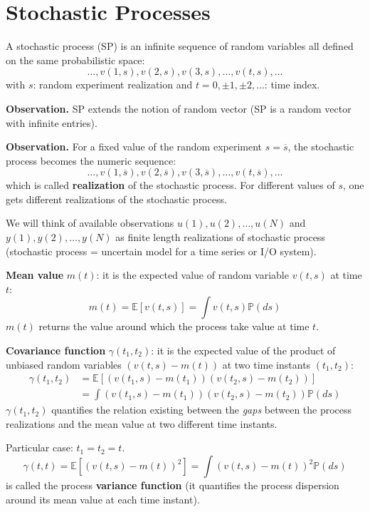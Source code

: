 \chapter{Stochastic Processes}
A stochastic process (SP) is an infinite sequence of random variables all defined on the same probabilistic space:
\[
	\ldots,v(1,s),v(2,s),v(3,s),\ldots,v(t,s),\ldots
\]
with $s$: random experiment realization and $t=0,\pm 1,\pm 2,\ldots$: time index.

\textbf{Observation.} SP extends the notion of random vector (SP is a random vector with infinite entries).

\textbf{Observation.} For a fixed value of the random experiment $s = \overline{s}$, the stochastic process becomes the numeric sequence:
\[
	\ldots,v(1,\overline{s}),v(2,\overline{s}),v(3,\overline{s}),\ldots,v(t,\overline{s}),\ldots
\]
which is called \textbf{realization} of the stochastic process.
For different values of $s$, one gets different realizations of the stochastic process.

We will think of available observations ${u(1),u(2),\ldots,u(N)}$ and ${y(1), y(2),\ldots, y(N)}$ as finite length realizations of stochastic process (stochastic process = uncertain model for a time series or I/O system).

\textbf{Mean value} $m(t)$: it is the expected value of random variable $v(t,s)$ at time $t$:
\[
	m(t)=\mathbb{E}[v(t, s)]=\int v(t, s) \mathbb{P}(ds)
\]
$m(t)$ returns the value around which the process take value at time $t$.

\textbf{Covariance function} $\gamma(t_{1}, t_{2})$: it is the expected value of the product of unbiased random variables $(v(t, s)-m(t))$ at two time instants $(t_{1}, t_{2}):$
\begin{align*}
	\gamma(t_{1}, t_{2}) &=\mathbb{E}[(v(t_{1}, s)-m(t_{1}))(v(t_{2}, s)-m(t_{2}))] \\
	&=\int(v(t_{1}, s)-m(t_{1}))(v(t_{2}, s)-m(t_{2})) \mathbb{P}(ds)
\end{align*}
$\gamma(t_{1}, t_{2})$ quantifies the relation existing between the \emph{gaps} between the process realizations and the mean value at two different time instants.

Particular case: $t_{1}=t_{2}=t$.
\[
	\gamma(t, t)=\mathbb{E}[(v(t, s)-m(t))^{2}]=\int(v(t, s)-m(t))^{2} \mathbb{P}(ds)
\]
is called the process \textbf{variance function} (it quantifies the process dispersion around its mean value at each time instant).

